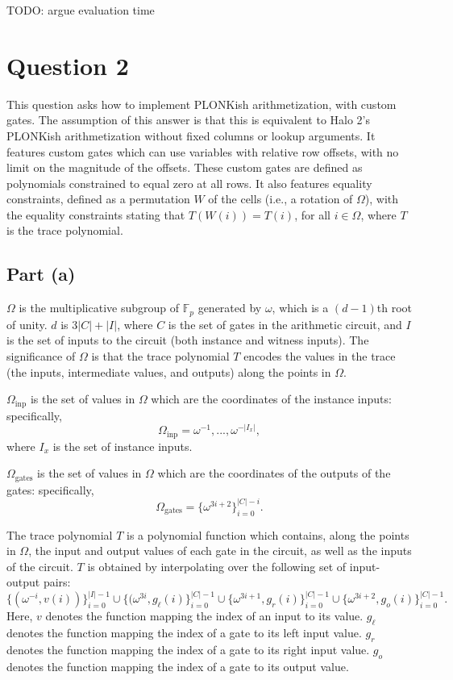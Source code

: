 \documentclass[11pt]{article}
\begin{document}
TODO: argue evaluation time

\section{Question 2}

This question asks how to implement PLONKish arithmetization, with custom gates. The assumption of this
answer is that this is equivalent to Halo 2's PLONKish arithmetization without fixed columns or
lookup arguments. It features custom gates which can use variables with relative row offsets, with
no limit on the magnitude of the offsets. These custom gates are defined as polynomials constrained to equal
zero at all rows. It also features equality constraints, defined as a permutation $W$ of the cells (i.e.,
a rotation of $\Omega$), with the equality constraints stating that $T(W(i)) = T(i)$, for all $i \in \Omega$,
where $T$ is the trace polynomial.

\subsection{Part (a)}

$\Omega$ is the multiplicative subgroup of $\mathbb{F}_p$ generated by $\omega$, which is a $(d-1)$th root of unity.
$d$ is $3|C| + |I|$, where $C$ is the set of gates in the arithmetic circuit, and $I$ is the set of inputs
to the circuit (both instance and witness inputs). The significance of $\Omega$ is that the trace polynomial
$T$ encodes the values in the trace (the inputs, intermediate values, and outputs) along the points in $\Omega$.

$\Omega_{\text{inp}}$ is the set of values in $\Omega$ which are the coordinates of the instance inputs: specifically,
\begin{equation}
	\Omega_{\text{inp}} = \omega^{-1}, ..., \omega^{-|I_x|},
\end{equation}
where $I_x$ is the set of instance inputs.

$\Omega_{\text{gates}}$ is the set of values in $\Omega$ which are the coordinates of the outputs of the gates:
specifically,
\begin{equation}
	\Omega_{\text{gates}} = \{\omega^{3i+2}\}_{i=0}^{|C|-i}.
\end{equation}

The trace polynomial $T$ is a polynomial function which contains, along the points in $\Omega$, the input and
output values of each gate in the circuit, as well as the inputs of the circuit. $T$ is obtained by
interpolating over the following set of input-output pairs:
\begin{equation}
	\{(\omega^{-i}, v(i))\}_{i=0}^{|I|-1} \cup \{(\omega^{3i}, g_\ell(i)\}_{i=0}^{|C|-1}
	\cup \{\omega^{3i+1}, g_r(i)\}_{i=0}^{|C|-1} \cup \{\omega^{3i+2}, g_o(i)\}_{i=0}^{|C|-1}.
\end{equation}
Here, $v$ denotes the function mapping the index of an input to its value. $g_\ell$ denotes the function mapping the
index of a gate to its left input value. $g_r$ denotes the function mapping the index of a gate to its
right input value. $g_o$ denotes the function mapping the index of a gate to its output value.
\end{document}
